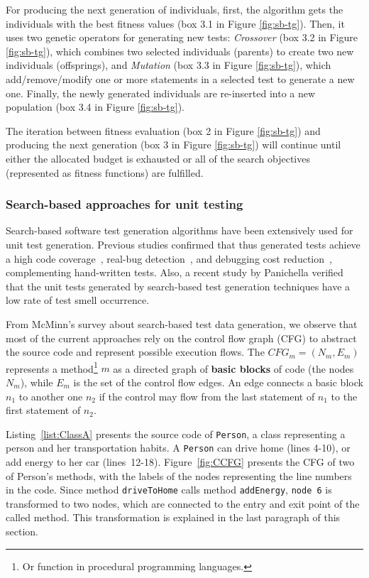For producing the next generation of individuals, first, the algorithm gets the individuals with the best fitness values (box 3.1 in Figure \ref{fig:sb-tg}). Then, it uses two genetic operators for generating new tests: \textit{Crossover} (box 3.2 in Figure \ref{fig:sb-tg}), which combines two selected individuals (parents) to create two new individuals (offsprings), and \textit{Mutation} (box 3.3 in Figure \ref{fig:sb-tg}), which add/remove/modify one or more statements in a selected test to generate a new one. Finally, the newly generated individuals are re-inserted into a new population (box 3.4 in Figure \ref{fig:sb-tg}).


The iteration between fitness evaluation (box 2 in Figure \ref{fig:sb-tg}) and producing the next generation (box 3 in Figure \ref{fig:sb-tg}) will continue until either the allocated budget is exhausted or all of the search objectives (represented as fitness functions) are fulfilled.

\subsubsection{Search-based approaches for unit testing}
Search-based software test generation algorithms have been extensively used for unit test generation. Previous studies confirmed that thus generated tests achieve a high code coverage~\cite{Panichella2018a, Campos2018}, real-bug detection~\cite{almasi2017industrial}, and debugging cost reduction~\cite{soltani2017, Panichella2016}, complementing hand-written tests. Also, a recent study by Panichella \etal \cite{panichella2020} verified that the unit tests generated by search-based test generation techniques have a low rate of test smell occurrence.

From McMinn's \cite{McMinn2004} survey about search-based test data generation, we observe that most of the current approaches rely on the control flow graph (CFG) to abstract the source code and represent possible execution flows. The $CFG_m=(N_m,E_m)$ represents a method\footnote{Or function in procedural programming languages.} $m$ as a directed graph of \textbf{basic blocks} of code (the nodes $N_m$), while $E_m$ is the set of the control flow edges. An edge connects a basic block $n_1$ to another one $n_2$ if the control may flow from the last statement of $n_1$ to the first statement of $n_2$. 

Listing~\ref{list:ClassA} presents the source code of \texttt{Person}, a class representing a person and her transportation habits. A \texttt{Person} can drive home (lines 4-10), or add energy to her car (lines~12-18). Figure~\ref{fig:CCFG} presents the CFG of two of Person's methods, with the labels of the nodes representing the line numbers in the code. Since method \texttt{driveToHome} calls method \texttt{addEnergy}, \texttt{node 6} is transformed to two nodes, which are connected to the entry and exit point of the called method. This transformation is explained in the last paragraph of this section.  

